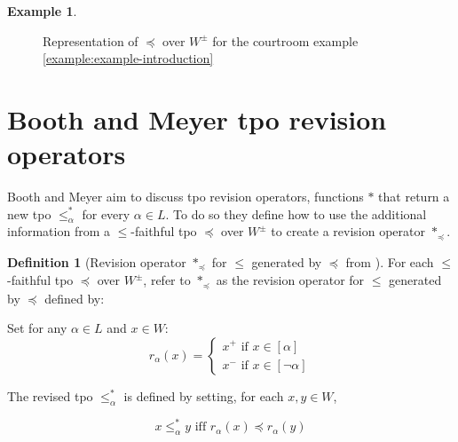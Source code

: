 \documentclass[english, 12pt]{scrartcl}
\theoremstyle{definition}
\newtheorem{example}{Example}[section]
\theoremstyle{definition}
\newtheorem{definition}{Definition}
\theoremstyle{definition}
\begin{document}
\begin{example}
\begin{figure}[h]
            \caption{Representation of $\preceq$ over $W^{\pm}$ for the courtroom example \ref{example:example-introduction}}
            \label{fig:example-tpo-initial}
    \end{figure}
\end{example}

\section{Booth and Meyer tpo revision operators}
Booth and Meyer \cite{Booth2011} aim to discuss tpo revision operators, functions $\ast$ that return a new tpo $\leq_{\alpha}^{\ast}$ for every $\alpha \in L$. To do so they define how to use the additional information from a $\leq$-faithful tpo $\preceq$ over $W^{\pm}$ to create a revision operator $\ast_{\preceq}$.

\begin{definition}[Revision operator $\ast_{\preceq}$ for $\leq$ generated by $\preceq$ from \cite{Booth2011}]
    \label{definition:revision-operator}
    For each $\leq$-faithful tpo $\preceq$ over $W^{\pm}$, refer to $\ast_{\preceq}$ as the revision operator for $\leq$ generated by $\preceq$ defined by:
    
    Set for any $\alpha \in L$ and $x \in W$:
    \begin{equation*}
        r_{\alpha}(x) = \left\{
                    \begin{array}{ll}
                      x^{+} \textrm{ if } x \in [\alpha]\\
                      x^{-} \textrm{ if } x \in [\neg\alpha]
                    \end{array}
                  \right.
    \end{equation*}
    
    The revised tpo $\leq_{\alpha}^{\ast}$ is defined by setting, for each $x, y \in W$,

    \begin{equation*}
        x \leq_{\alpha}^{\ast} y \textrm{ iff } r_{\alpha}(x) \preceq r_{\alpha}(y)
    \end{equation*}
\end{definition}
\end{document}
